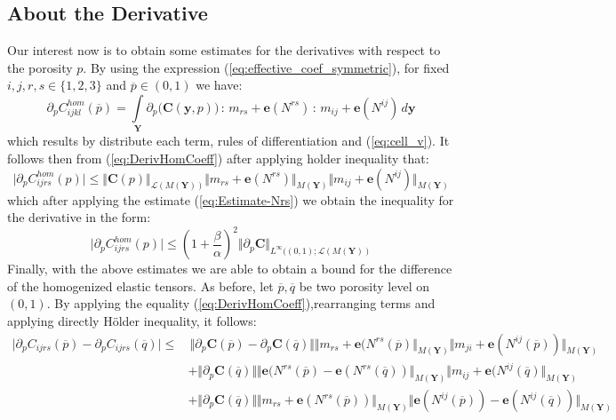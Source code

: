 \subsection{About the Derivative}
Our interest now is to obtain some estimates for the derivatives with respect to the porosity $p$. By using the expression (\ref{eq:effective_coef_symmetric}), for fixed $i,j,r,s \in \{1,2,3\}$ and $\overline{p} \in (0,1)$ we have:
\begin{equation}
    \label{eq:DerivHomCoeff}
    \partial_{p}  C_{ijkl}^{hom} (\overline{p}) = \int\limits_{\mathbf{Y}} \partial_{p}\big( \mathbf{C}(\mathbf{y},p) \big)\, : \,m_{rs}+\mathbf{e}(N^{rs})\, :\,m_{ij}+\mathbf{e}(N^{ij}) \, d\mathbf{y} 
\end{equation}
which results by distribute each term, rules of differentiation and (\ref{eq:cell_v}).
It follows then from (\ref{eq:DerivHomCoeff}) after applying holder inequality that:
\begin{equation*}
    \vert \partial_p C^{hom}_{ijrs}(p) \vert \leq \Vert \mathbf{C}(p) \Vert_{\mathcal{L}(M(\mathbf{Y}))} \Vert m_{rs} + \mathbf{e}(N^{rs}) \Vert_{M(\mathbf{Y})} \Vert m_{ij} + \mathbf{e}(N^{ij}) \Vert_{M(\mathbf{Y})}
\end{equation*}
which after applying the estimate (\ref{eq:Estimate-Nrs}) we obtain the inequality for the derivative in the form:
\begin{equation}
    \label{EstimateDerivHomCoeff}
    \vert \partial_p C^{hom}_{ijrs}(p) \vert \leq (1+\frac{\beta}{\alpha})^2 \Vert \partial_p \mathbf{C}\Vert_{L^{\infty}((0,1); \mathcal{L}(M(\mathbf{Y}))}
\end{equation}
Finally, with the above estimates we are able to obtain a bound for the difference of the homogenized elastic tensors. As before, let $\overline{p}, \overline{q}$ be two porosity level on $(0,1)$.
By applying the equality (\ref{eq:DerivHomCoeff}),rearranging terms and applying directly H\"{o}lder inequality, it follows:
\begin{align*}
    \vert \partial_p C_{ijrs}(\overline{p}) - \partial_p C_{ijrs}(\overline{q}) \vert \leq & \,\Vert \partial_p \mathbf{C}(\overline{p}) - \partial_p \mathbf{C}(\overline{q}) \Vert \Vert m_{rs} + \mathbf{e}(N^{rs}(\overline{p}) \Vert_{M(\mathbf{Y})} \Vert m_{ji} + \mathbf{e}(N^{ij}(\overline{p}))\Vert_{M(\mathbf{Y})} \\
    & + \Vert \partial_p \mathbf{C}(\overline{q}) \Vert \Vert \mathbf{e}(N^{rs}(\overline{p}) -\mathbf{e}(N^{rs}(\overline{q})) \Vert_{M(\mathbf{Y})} \Vert m_{ij} + \mathbf{e}(N^{ij}(\overline{q}) \Vert_{M(\mathbf{Y})}  \\
    & + \Vert \partial_p \mathbf{C}(\overline{q}) \Vert \Vert m_{rs} + \mathbf{e}(N^{rs}(\overline{p})) \Vert_{M(\mathbf{Y})} \Vert \mathbf{e}(N^{ij}(\overline{p})) - \mathbf{e}(N^{ij}(\overline{q})) \Vert_{M(\mathbf{Y})}
\end{align*}
